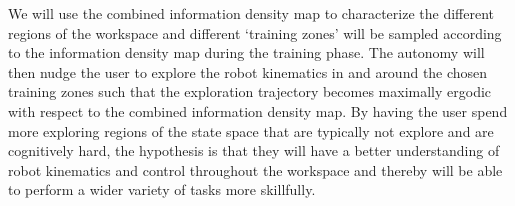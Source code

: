 \documentclass[12pt]{article}
\begin{document}
We will use the combined information density map to characterize the different regions of the workspace and different `training zones' will be sampled according to the information density map during the training phase. The autonomy will then nudge the user to explore the robot kinematics in and around the chosen training zones such that the exploration trajectory becomes maximally ergodic with respect to the combined information density map. By having the user spend more exploring regions of the state space that are typically not explore and are cognitively hard, the hypothesis is that they will have a better understanding of robot kinematics and control throughout the workspace and thereby will be able to perform a wider variety of tasks more skillfully. 
% 
%
%
%
%
%
%
\end{document}
